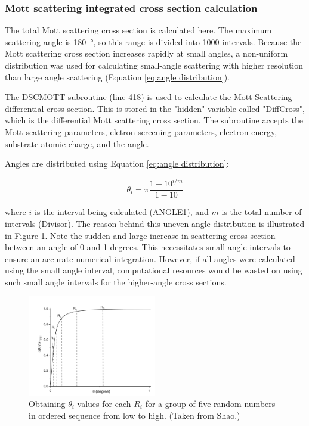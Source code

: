 \documentclass[10pt, reqno]{exam}
\begin{document}
\clearpage

\subsubsection{Mott scattering integrated cross section calculation}

The total Mott scattering cross section is calculated here. The maximum scattering angle is \SI{180}{\degree}, so this range is divided into 1000 intervals. Because the Mott scattering cross section increases rapidly at small angles, a non-uniform distribution was used for calculating small-angle scattering with higher resolution than large angle scattering (Equation \ref{eq:angle distribution}). \par

The DSCMOTT subroutine (line 418) is used to calculate the Mott Scattering differential cross section. This is stored in the "hidden" variable called "DiffCross", which is the differential Mott scattering cross section. The subroutine accepts the Mott scattering parameters, eletron screening parameters, electron energy, substrate atomic charge, and the angle. \par

Angles are distributed using Equation \ref{eq:angle distribution}: \par

\begin{equation}
    \theta_i = \pi\frac{1 - 10^{i/m}}{1 - 10}
    \label{eq:angle distribution}
\end{equation}

where $i$ is the interval being calculated (ANGLE1), and $m$ is the total number of intervals (Divisor). The reason behind this uneven angle distribution is illustrated in Figure \ref{fig:shao angle distribution}. Note the sudden and large increase in scattering cross section between an angle of 0 and 1 degrees. This necessitates small angle intervals to ensure an accurate numerical integration. However, if all angles were calculated using the small angle interval, computational resources would be wasted on using such small angle intervals for the higher-angle cross sections. \par

\begin{figure}
    \centering
    \includegraphics[width = 0.5\textwidth]{figures/shao angle distribution.png}
    \caption{Obtaining $\theta_i$ values for each $R_i$ for a group of five random numbers in ordered sequence from low to high. (Taken from Shao.)}
    \label{fig:shao angle distribution}
\end{figure}
\end{document}
